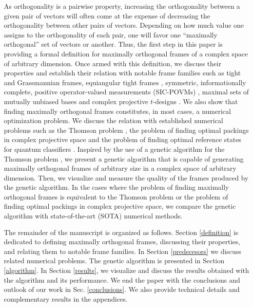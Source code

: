 \documentclass[%
superscriptaddress,
amsmath,amssymb,
 aps,
pra,
floatfix,
]{revtex4-2}
\begin{document}
As orthogonality is a pairwise property, increasing the orthogonality between a given pair of vectors will often come at the expense of decreasing the orthogonality between other pairs of vectors. 
Depending on how much value one assigns to the orthogonality of each pair, one will favor one ``maximally orthogonal'' set of vectors or another. Thus, the first step in this paper is providing a formal definition for maximally orthogonal frames of a complex space of arbitrary dimension. Once armed with this definition, we discuss their properties and establish their relation with notable frame families such as tight and Grassmannian frames, equiangular tight frames \cite{strohmer2003grassmannian}, symmetric, informationally complete, positive operator-valued measurements (SIC-POVMs) \cite{fuchs2017the}, maximal sets of mutually unbiased bases \cite{schwinger1960unitary, ivonovic1981geometrical} and complex projective $t$-designs \cite{delsarte1977spherical, hoggar1982tdesings}. We also show that finding maximally orthogonal frames constitutes, in most cases, a numerical optimization problem. We discuss the relation with established numerical problems such as the Thomson problem \cite{thomson1904on}, the problem of finding optimal packings in complex projective space \cite{jasper2019game} and the problem of finding optimal reference states for quantum classifiers \cite{perezsalinas2020data, rocajerat2024qudit}. Inspired by the use of a genetic algorithm for the Thomson problem \cite{morris1996geneticalgorithm}, we present a genetic algorithm that is capable of generating maximally orthogonal frames of arbitrary size in a complex space of arbitrary dimension.  Then, we visualize and measure the quality of the frames produced by the genetic algorithm. In the cases where the problem of finding maximally orthogonal frames is equivalent to the Thomson problem or the problem of finding optimal packings in complex projective space, we compare the genetic algorithm with state-of-the-art (SOTA) numerical methods.

The remainder of the manuscript is organized as follows. Section \ref{definition} is dedicated to defining maximally orthogonal frames, discussing their properties, and relating them to notable frame families. In Section \ref{predecesors} we discuss related numerical problems. The genetic algorithm is presented in Section \ref{algorithm}. In Section \ref{results}, we visualize and discuss the results obtained with the algorithm and its performance. We end the paper with the conclusions and outlook of our work in Sec. \ref{conclusions}. We also provide technical details and complementary results in the appendices.
\end{document}
